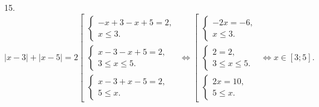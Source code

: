 15. $|x-3|+|x-5|=2 \left[\begin{array}{l}\begin{cases} -x+3-x+5=2,\\ x\leqslant 3.\end{cases}\\
\begin{cases} x-3-x+5=2,\\ 3\leqslant x\leqslant 5 .\end{cases}\\\begin{cases} x-3+x-5=2,\\ 5\leqslant x.\end{cases}\end{array}\right.\Leftrightarrow
\left[\begin{array}{l}\begin{cases} -2x=-6,\\ x\leqslant 3.\end{cases}\\
\begin{cases} 2=2,\\ 3\leqslant x\leqslant 5 .\end{cases}\\\begin{cases} 2x=10,\\ 5\leqslant x.\end{cases}\end{array}\right.\Leftrightarrow x\in[3;5].$\\
